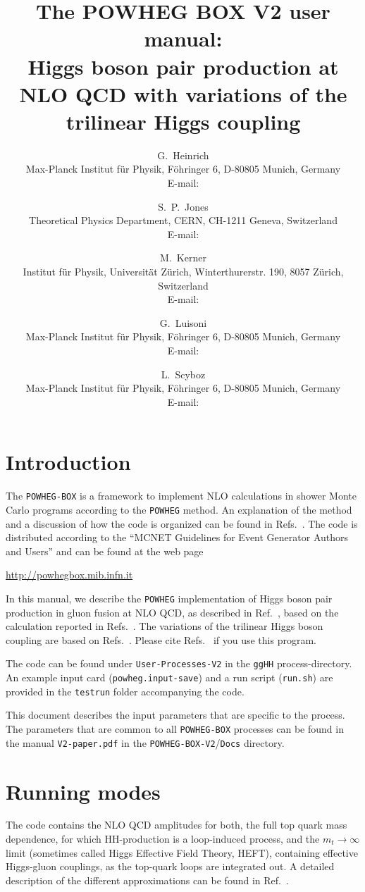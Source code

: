 \documentclass[paper]{JHEP3}
\title{The POWHEG BOX V2 user manual:\\
  Higgs boson pair production at NLO QCD with variations of the trilinear Higgs coupling} \vfill
\author{G.~Heinrich\\ 
  Max-Planck Institut f{\"u}r Physik, F\"ohringer 6, D-80805 Munich, Germany\\
  E-mail: \email{gudrun@mpp.mpg.de}
}
\author{S.~P.~Jones \\ 
Theoretical Physics Department, CERN, CH-1211 Geneva, Switzerland  \\
  E-mail: \email{s.jones@cern.ch}
}
\author{M.~Kerner \\ 
  Institut f{\"u}r Physik, Universit{\"a}t Z{\"u}rich, Winterthurerstr. 190, 8057 Z{\"u}rich, Switzerland\\
  E-mail: \email{kerner@mpp.mpg.de}
}
\author{G.~Luisoni\\
Max-Planck Institut f{\"u}r Physik, F\"ohringer 6, D-80805 Munich, Germany\\ 
  E-mail: \email{luisonig@gmail.com}
  }
\author{L.~Scyboz\\
 Max-Planck Institut f{\"u}r Physik, F\"ohringer 6, D-80805 Munich, Germany\\ 
  E-mail: \email{scyboz@mpp.mpg.de}
}
\newcommand\POWHEG{{\tt POWHEG}}
\newcommand\POWHEGBOX{{\tt POWHEG-BOX}}
\newcommand\POWHEGBOXV{{\tt POWHEG-BOX-V2}}
\begin{document}
\section{Introduction}

The \POWHEGBOX{} is a framework to implement NLO
calculations in shower Monte Carlo programs according to the \POWHEG{}
method. An explanation of the method and a discussion of how the code
is organized can be found in
Refs.~\cite{Nason:2004rx,Frixione:2007vw,Alioli:2010xd,Jezo:2015aia}.
The code is distributed according to the ``MCNET Guidelines for Event
Generator Authors and Users'' and can be found at the web page
%
\begin{center}
 \url{http://powhegbox.mib.infn.it}
\end{center}
%
In this manual, we describe the \POWHEG{} implementation of Higgs
boson pair production in gluon fusion at NLO QCD, as described in
Ref.~\cite{Heinrich:2017kxx}, based on the calculation reported in
Refs.~\cite{Borowka:2016ehy,Borowka:2016ypz}.  
The variations of the trilinear Higgs boson coupling are based on Refs.~\cite{Buchalla:2018yce,VarLambda2019-arXivNumber}.
Please cite Refs.~\cite{Heinrich:2017kxx,VarLambda2019-arXivNumber} if you use this program.

The code can be found under {\tt User-Processes-V2} in the {\tt ggHH} process-directory. 
An example input card ({\tt powheg.input-save}) and a run script ({\tt run.sh}) 
are provided in the {\tt testrun} folder accompanying the code.

This document describes the input parameters that are specific to the process. The
parameters that are common to all \POWHEGBOX{} processes can be found
in the manual {\tt V2-paper.pdf} in the \POWHEGBOXV{}/{\tt Docs} directory.

\section{Running modes}
The code contains the NLO QCD amplitudes for both, the full top quark mass dependence, 
for which HH-production is a loop-induced process, and the
$m_t\to \infty$ limit (sometimes called Higgs Effective Field Theory, HEFT), 
containing effective Higgs-gluon couplings, as the top-quark loops are integrated out.  
A detailed description of the different approximations can be found in Ref.~\cite{Borowka:2016ypz}.
\end{document}

